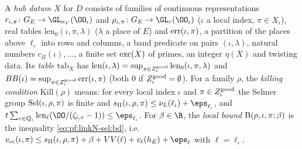 \begin{definition}\label{pf:linkN-sel:hub}
A \emph{hub datum} $X$ for $D$ consists of families of continuous representations $r_{\iota,\pi}\colon G_E\to\GL_{n_V}(\OO_\iota)$ and
$\rho_{\iota,\pi}\colon G_E\to\GL_r(\OO_\iota)$ ($\iota$ a local index, $\pi\in X_\iota$), real tables $\mathrm{len}_0(\iota,\pi,\lambda)$
($\lambda$ a place of $E$) and $\mathrm{err}(\iota,\pi)$, a partition of the places above $\ell_\iota$ into rows and columns, a band
predicate on pairs $(\iota,\lambda)$, natural numbers $c_B(\iota),\dots$, a finite set $\mathrm{exc}(X)$ of primes, an integer $\eta(X)$
and twisting data. Its \emph{table} $\mathrm{tab}_X$ has $\mathrm{len}(\iota,\lambda)=\sup_{\pi\in Z^{\mathrm{good}}_\iota}
\mathrm{len}_0(\iota,\pi,\lambda)$ and $BB(\iota)=\sup_{\pi\in Z^{\mathrm{good}}_\iota}\mathrm{err}(\iota,\pi)$ (both $0$ if
$Z^{\mathrm{good}}_\iota=\emptyset$). For a family $\rho$, the \emph{killing condition} $\mathrm{Kill}(\rho)$ means: for every local index
$\iota$ and $\pi\in Z^{\mathrm{good}}_\iota$ the Selmer group $\operatorname{Sel}(\iota,\rho,\pi)$ is finite and
$\linkNselsP(\iota,\rho,\pi)\le\nu_L(\ell_\iota)+\eps_{\ell_\iota}$, and $t\sum_{v\in Q_\iota}\linkNsellen(\OO/(\zeta_{\iota,v}-1))\le
\eps_{\ell_\iota}$. For $\beta\in\R$, the \emph{local bound} $\mathrm{B}(\rho,\iota,\pi;\beta)$ is the inequality
\eqref{eq:pf:linkN-sel:bd}, i.e.\ $\linkNselvcc(\iota,\pi)\le\linkNselsP(\iota,\rho,\pi)+\beta+VV(\ell)+v_\ell(h_E)+\eps_\ell$ with
$\ell=\ell_\iota$.
\end{definition}

